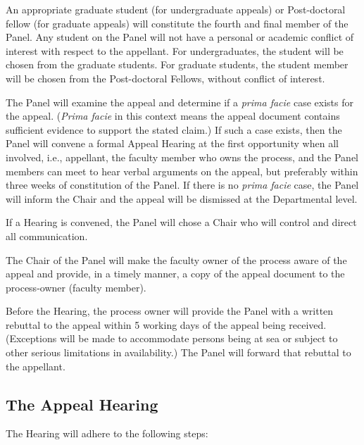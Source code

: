 \p An appropriate graduate student (for undergraduate appeals) or
Post-doctoral fellow (for graduate appeals) will constitute the fourth and
final member of the Panel.  Any student on the Panel will not have a personal
or academic conflict of interest with respect to the appellant.  For
undergraduates, the student will be chosen from the graduate students.  For
graduate students, the student member will be chosen from the Post-doctoral
Fellows, without conflict of interest.  

\p The Panel will examine the appeal and determine if a \emph{prima
facie} case exists for the appeal.  (\emph{Prima facie} in this context means
the appeal document contains sufficient evidence to support the stated claim.)
If such a case exists, then the Panel will convene a formal Appeal Hearing at
the first opportunity when all involved, i.e., appellant, the faculty member
who owns the process, and the Panel members can meet to hear verbal arguments
on the appeal, but preferably within three weeks of constitution of the Panel.
If there is no \emph{prima facie} case, the Panel will inform the Chair and the
appeal will be dismissed at the Departmental level.

\p If a Hearing is convened, the Panel will chose a Chair who will
control and direct all communication.

\p The Chair of the Panel will make the faculty owner of the process
aware of the appeal and provide, in a timely manner, a copy of the appeal
document to the process-owner (faculty member).  

\p Before the Hearing, the process owner will provide the Panel with a
written rebuttal to the appeal within 5 working days of the appeal being
received.  (Exceptions will be made to accommodate persons being at sea or
subject to other serious limitations in availability.)  The Panel will forward
that rebuttal to the appellant.


\subsection{The Appeal Hearing}
\cp

\p The Hearing will adhere to the following steps:

